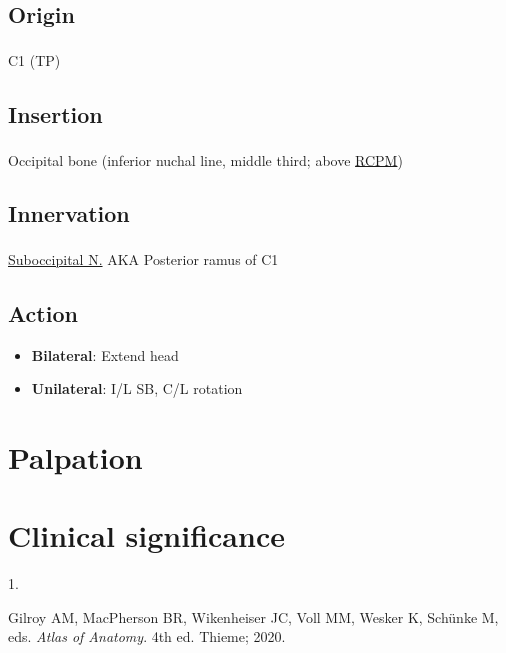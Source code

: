 \documentclass[
  letterpaper,
  DIV=11,
  numbers=noendperiod]{scrartcl}
\providecommand{\tightlist}{%
  \setlength{\itemsep}{0pt}\setlength{\parskip}{0pt}}\usepackage{longtable,booktabs,array}
\newlength{\cslhangindent}
\newlength{\csllabelwidth}
\newenvironment{CSLReferences}[2] %
 {\begin{list}{}{%
  \setlength{\itemindent}{0pt}
  \setlength{\leftmargin}{0pt}
  \setlength{\parsep}{0pt}
  \ifodd #1
   \setlength{\leftmargin}{\cslhangindent}
   \setlength{\itemindent}{-1\cslhangindent}
  \fi
  \setlength{\itemsep}{#2\baselineskip}}}
 {\end{list}}
\newcommand{\CSLLeftMargin}[1]{\parbox[t]{\csllabelwidth}{\strut#1\strut}}
\newcommand{\CSLRightInline}[1]{\parbox[t]{\linewidth - \csllabelwidth}{\strut#1\strut}}
\begin{document}
\subsection{Origin}\label{origin}

C1 (TP)\textsuperscript{}

\subsection{Insertion}\label{insertion}

Occipital bone (inferior nuchal line, middle third; above
\href{../../../../Alchemy\%20Archive/Anatomy/OIANs/Muscles\%20of\%20the\%20back/rectus_capitis_posterior_major.qmd}{RCPM})\textsuperscript{}

\subsection{Innervation}\label{innervation}

\href{../../../../Alchemy\%20Archive/Anatomy/Nerves/suboccipital_nerve.qmd}{Suboccipital
N.} AKA Posterior ramus of
C1\textsuperscript{}

\subsection{Action}\label{action}

\begin{itemize}
\tightlist
\item
  \textbf{Bilateral}: Extend head
\item
  \textbf{Unilateral}: I/L SB, C/L rotation
\end{itemize}

\section{Palpation}\label{palpation}

\section*{Clinical significance}\label{clinical-significance}

\label{refs}
\begin{CSLReferences}{0}{1}
\CSLLeftMargin{1. }%
\CSLRightInline{Gilroy AM, MacPherson BR, Wikenheiser JC, Voll MM,
Wesker K, Schünke M, eds. \emph{Atlas of Anatomy}. 4th ed. {Thieme};
2020.}

\end{CSLReferences}
\end{document}
